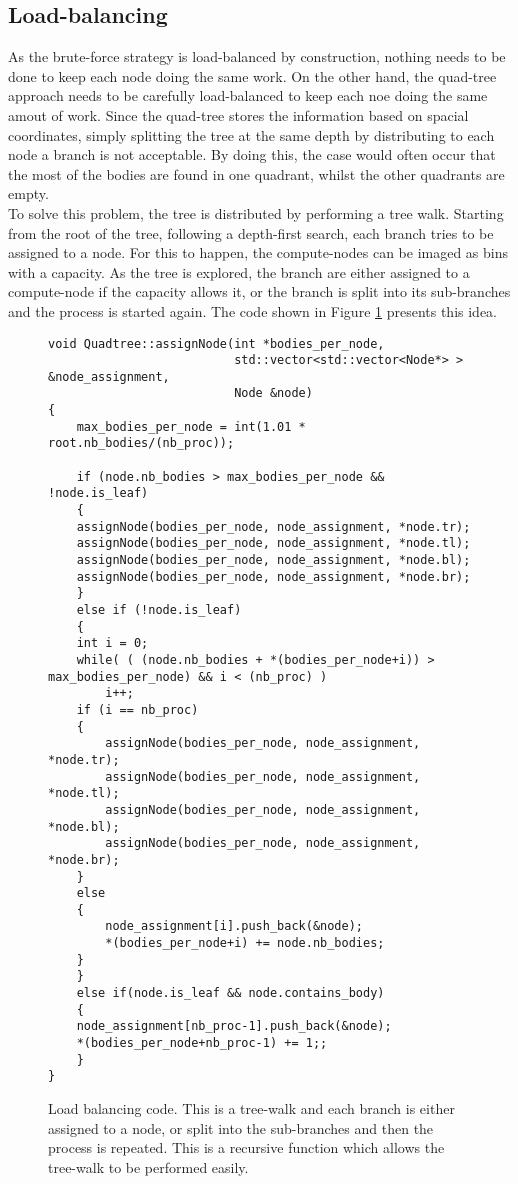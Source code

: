 \subsection{Load-balancing}\label{sec:lb}
As the brute-force strategy is load-balanced by construction, nothing needs to be done to keep each node doing the same work. On the other hand, the quad-tree approach needs to be carefully load-balanced to keep each noe doing the same amout of work. Since the quad-tree stores the information based on spacial coordinates, simply splitting the tree at the same depth by distributing to each node a branch is not acceptable. By doing this, the case would often occur that the most of the bodies are found in one quadrant, whilst the other quadrants are empty.\\
To solve this problem, the tree is distributed by performing a tree walk. Starting from the root of the tree, following a depth-first search, each  branch tries to be assigned to a node. For this to happen, the compute-nodes can be imaged as bins with a capacity. As the tree is explored, the branch are either assigned to a compute-node if the capacity allows it, or the branch is split into its sub-branches and the process is started again. The code shown in Figure \ref{fig:load-balancing} presents this idea.
\begin{figure}[H]
  \begin{adjustwidth}{-0.5cm}{-0.5cm}   

  \begin{verbatim}
void Quadtree::assignNode(int *bodies_per_node,
                          std::vector<std::vector<Node*> > &node_assignment,
                          Node &node)
{
    max_bodies_per_node = int(1.01 * root.nb_bodies/(nb_proc));

    if (node.nb_bodies > max_bodies_per_node && !node.is_leaf)
    {
	assignNode(bodies_per_node, node_assignment, *node.tr);
	assignNode(bodies_per_node, node_assignment, *node.tl);
	assignNode(bodies_per_node, node_assignment, *node.bl);
	assignNode(bodies_per_node, node_assignment, *node.br);
    }
    else if (!node.is_leaf)
    {
	int i = 0;
	while( ( (node.nb_bodies + *(bodies_per_node+i)) > max_bodies_per_node) && i < (nb_proc) )	
	    i++;
	if (i == nb_proc)
	{	  
	    assignNode(bodies_per_node, node_assignment, *node.tr);
	    assignNode(bodies_per_node, node_assignment, *node.tl);
	    assignNode(bodies_per_node, node_assignment, *node.bl);
	    assignNode(bodies_per_node, node_assignment, *node.br);
	}
	else
	{
	    node_assignment[i].push_back(&node);
	    *(bodies_per_node+i) += node.nb_bodies;
	}	
    }
    else if(node.is_leaf && node.contains_body)
    {
	node_assignment[nb_proc-1].push_back(&node);
	*(bodies_per_node+nb_proc-1) += 1;;
    }
}
  \end{verbatim}
\caption{Load balancing code. This is a tree-walk and each branch is either assigned to a node, or split into the sub-branches and then the process is repeated. This is a recursive function which allows the tree-walk to be performed easily.}
\label{fig:load-balancing}
  \end{adjustwidth}

\end{figure}
